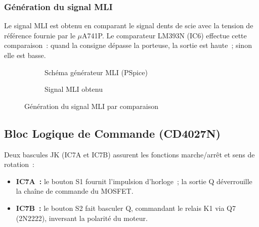 \documentclass[a4paper,12pt,openany]{book}
\begin{document}
\subsubsection{G\'en\'eration du signal MLI}

Le signal MLI est obtenu en comparant le signal dents de scie avec la
tension de r\'ef\'erence fournie par le $\mu$A741P. Le comparateur LM393N
(IC6) effectue cette comparaison~: quand la consigne d\'epasse la porteuse,
la sortie est haute~; sinon elle est basse.

\begin{figure}[H]
  \centering
  \begin{subfigure}[b]{0.52\textwidth}
    \centering
    \caption{Sch\'ema g\'en\'erateur MLI (PSpice)}
  \end{subfigure}
  \hfill
  \begin{subfigure}[b]{0.44\textwidth}
    \centering
    \caption{Signal MLI obtenu}
  \end{subfigure}
  \caption{G\'en\'eration du signal MLI par comparaison}
  \label{fig:mli}
\end{figure}

\subsection{Bloc Logique de Commande (CD4027N)}

Deux bascules JK (IC7A et IC7B) assurent les fonctions marche/arr\^et et
sens de rotation~:
\begin{itemize}
  \item \textbf{IC7A~:} le bouton S1 fournit l'impulsion d'horloge~;
        la sortie Q d\'everrouille la cha\^ine de commande du MOSFET.
  \item \textbf{IC7B~:} le bouton S2 fait basculer Q, commandant le relais
        K1 via Q7 (2N2222), inversant la polarit\'e du moteur.
\end{itemize}
\end{document}
